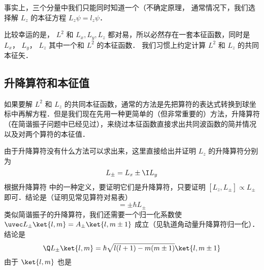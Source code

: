 事实上，三个分量中我们只能同时知道一个（不确定原理，%
通常情况下，我们选择解 $L_z$ 的本征方程 $L_z \psi = l_z\psi$． 

比较幸运的是， $L^2$ 和 $L_x, L_y, L_z$ 都对易，所以必然存在一套本征函数，同时是 $L_x$， $L_y$，  $L_z$ 其中一个和 $L^2$ 的本征函数． 我们习惯上约定计算 $L^2$ 和 $L_z$ 的共同本征矢．

\subsection{升降算符和本征值}

如果要解 $L^2$ 和 $L_z$ 的共同本征函数，通常的方法是先把算符的表达式转换到球坐标中再解方程．但是我们现在先用一种更简单的（但非常重要的）方法，升降算符（在简谐振子问题中已经见过），来绕过本征函数直接求出共同波函数的简并情况以及对两个算符的本征值．

由于升降算符没有什么方法可以求出来，这里直接给出并证明 $L_z$ 的升降算符分别为
\begin{equation}
L_\pm = L_x \pm \I L_y
\end{equation}
根据升降算符 中的一种定义，要证明它们是升降算符，只要证明 $[L_z, L_\pm] \propto L_\pm$ 即可．结论是（证明见常见算符对易表）%
\begin{equation}
[L_z, L_\pm] =  \pm \hbar L_ \pm
\end{equation}
类似简谐振子的升降算符，我们还需要一个归一化系数使 $\uvec L_\pm \ket{l,m} = A_ \pm \ket{l,m \pm 1}$ 成立（见轨道角动量升降算符归一化）．结论是
\begin{equation}
\Q L_\pm \ket{l, m}  = \hbar \sqrt{l(l + 1) - m(m \pm 1)} \ket{l, m \pm 1} 
\end{equation}
由于 $\ket{l,m}$ 也是



